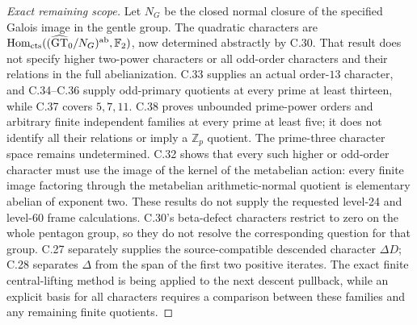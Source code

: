 \begin{proof}[Exact remaining scope]
Let $N_G$ be the closed normal closure of the specified Galois image
in the gentle group. The quadratic characters are
$\operatorname{Hom}_{\mathrm{cts}}((\widehat{\mathrm{GT}}_0/N_G)^{\mathrm{ab}},
\mathbb F_2)$, now determined abstractly by C.30. That result does not
specify higher two-power characters or all odd-order characters and
their relations in the full abelianization. C.33 supplies an actual
order-$13$ character, and C.34--C.36 supply odd-primary quotients
at every prime at least thirteen, while C.37 covers $5,7,11$.
C.38 proves unbounded prime-power orders and arbitrary finite
independent families at every prime at least five; it does not
identify all their relations or imply a $\mathbb Z_p$ quotient.
The prime-three character space remains undetermined.
C.32 shows that every such higher
or odd-order character must use the image of the kernel of
the metabelian action: every finite image factoring through the
metabelian arithmetic-normal quotient is elementary abelian of
exponent two. These results do not supply the requested level-24 and
level-60 frame calculations. C.30's beta-defect characters
restrict to zero on the whole pentagon group, so they do not resolve
the corresponding question for that group. C.27 separately supplies
the source-compatible descended character $\Delta D$; C.28 separates
$\Delta$ from the span of the first two positive iterates. The exact
finite central-lifting method is being applied to the next descent
pullback, while an explicit basis for all characters requires a
comparison between these families and any remaining finite quotients.
\end{proof}

